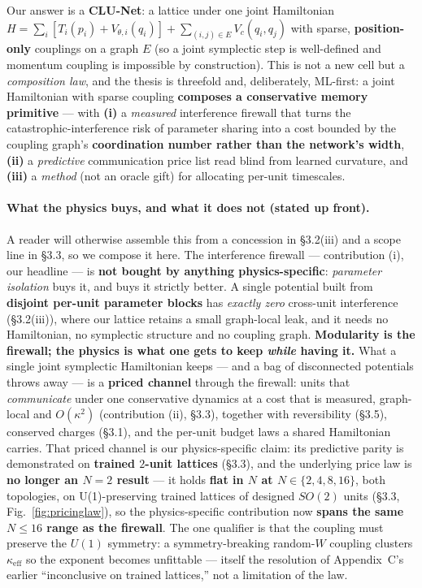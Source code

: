 \documentclass[11pt]{article}
\newcommand{\keff}{\kappa_{\mathrm{eff}}}
\begin{document}
Our answer is a \textbf{CLU-Net}: a lattice under one joint Hamiltonian $H=\sum_i[T_i(p_i)+V_{\theta,i}(q_i)]+\sum_{(i,j)\in E}V_c(q_i,q_j)$ with sparse, \textbf{position-only} couplings on a graph $E$ (so a joint symplectic step is well-defined and momentum coupling is impossible by construction). This is not a new cell but a \emph{composition law}, and the thesis is threefold and, deliberately, ML-first: a joint Hamiltonian with sparse coupling \textbf{composes a conservative memory primitive} --- with \textbf{(i)} a \emph{measured} interference firewall that turns the catastrophic-interference risk of parameter sharing into a cost bounded by the coupling graph's \textbf{coordination number rather than the network's width}, \textbf{(ii)} a \emph{predictive} communication price list read blind from learned curvature, and \textbf{(iii)} a \emph{method} (not an oracle gift) for allocating per-unit timescales.

\paragraph{What the physics buys, and what it does not (stated up front).} A reader will otherwise assemble this from a concession in \S3.2(iii) and a scope line in \S3.3, so we compose it here. The interference firewall --- contribution (i), our headline --- is \textbf{not bought by anything physics-specific}: \emph{parameter isolation} buys it, and buys it strictly better. A single potential built from \textbf{disjoint per-unit parameter blocks} has \emph{exactly zero} cross-unit interference (\S3.2(iii)), where our lattice retains a small graph-local leak, and it needs no Hamiltonian, no symplectic structure and no coupling graph. \textbf{Modularity is the firewall; the physics is what one gets to keep \emph{while} having it.} What a single joint symplectic Hamiltonian keeps --- and a bag of disconnected potentials throws away --- is a \textbf{priced channel} through the firewall: units that \emph{communicate} under one conservative dynamics at a cost that is measured, graph-local and $O(\kappa^2)$ (contribution (ii), \S3.3), together with reversibility (\S3.5), conserved charges (\S3.1), and the per-unit budget laws a shared Hamiltonian carries. That priced channel is our physics-specific claim: its predictive parity is demonstrated on \textbf{trained $2$-unit lattices} (\S3.3), and the underlying price law is \textbf{no longer an $N=2$ result} --- it holds \textbf{flat in $N$ at $N\in\{2,4,8,16\}$}, both topologies, on U(1)-preserving trained lattices of designed $SO(2)$ units (\S3.3, Fig.~\ref{fig:pricinglaw}), so the physics-specific contribution now \textbf{spans the same $N\le16$ range as the firewall}. The one qualifier is that the coupling must preserve the $U(1)$ symmetry: a symmetry-breaking random-$W$ coupling clusters $\keff$ so the exponent becomes unfittable --- itself the resolution of Appendix~C's earlier ``inconclusive on trained lattices,'' not a limitation of the law.
\end{document}
